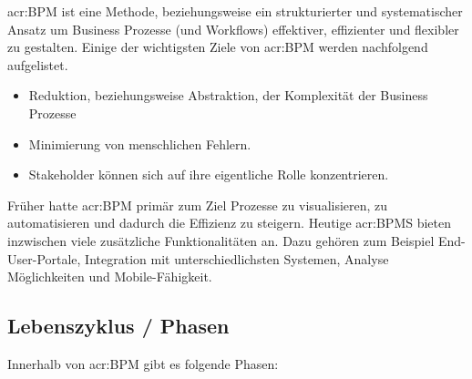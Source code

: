 \gls{acr:BPM} ist eine Methode, beziehungsweise ein strukturierter und systematischer Ansatz um Business Prozesse (und Workflows) effektiver, effizienter und flexibler zu gestalten.
Einige der wichtigsten Ziele von \gls{acr:BPM} werden nachfolgend aufgelistet.

\begin{itemize}
\item Reduktion, beziehungsweise Abstraktion, der Komplexität der Business Prozesse
\item Minimierung von menschlichen Fehlern.
\item Stakeholder können sich auf ihre eigentliche Rolle konzentrieren.
\end{itemize}

Früher hatte \gls{acr:BPM} primär zum Ziel Prozesse zu visualisieren, zu automatisieren und dadurch die Effizienz zu steigern. Heutige \gls{acr:BPMS} bieten inzwischen viele zusätzliche Funktionalitäten an. Dazu gehören zum Beispiel End-User-Portale, Integration mit unterschiedlichsten Systemen, Analyse Möglichkeiten und Mobile-Fähigkeit.


\subsection{Lebenszyklus / Phasen}
Innerhalb von \gls{acr:BPM} gibt es folgende Phasen:

\begin{itemize}
\end{itemize}


